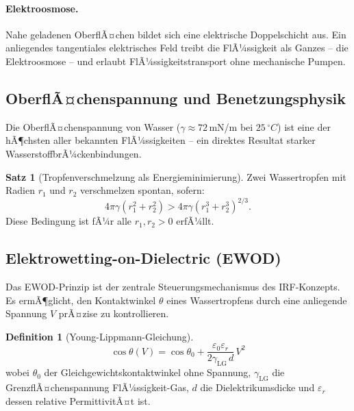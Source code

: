 ﻿\documentclass[a4paper,12pt]{scrreprt}
\theoremstyle{definition}
\newtheorem{definition}{Definition}[section]
\newtheorem{satz}{Satz}[section]
\begin{document}
\paragraph{Elektroosmose.}
Nahe geladenen OberflÃ¤chen bildet sich eine elektrische Doppelschicht aus.
Ein anliegendes tangentiales elektrisches Feld treibt die FlÃ¼ssigkeit als
Ganzes -- die Elektroosmose -- und erlaubt FlÃ¼ssigkeitstransport ohne
mechanische Pumpen.

\subsection{OberflÃ¤chenspannung und Benetzungsphysik}

Die OberflÃ¤chenspannung von Wasser ($\gamma \approx 72$\,mN/m bei $25\,^{\circ}C$)
ist eine der hÃ¶chsten aller bekannten FlÃ¼ssigkeiten -- ein direktes Resultat
starker WasserstoffbrÃ¼ckenbindungen.

\begin{satz}[Tropfenverschmelzung als Energieminimierung]
  Zwei Wassertropfen mit Radien $r_1$ und $r_2$ verschmelzen spontan, sofern:
  \begin{equation}
    4\pi\gamma(r_1^2 + r_2^2) > 4\pi\gamma(r_1^3 + r_2^3)^{2/3}.
    \label{eq:energieminimierung}
  \end{equation}
  Diese Bedingung ist fÃ¼r alle $r_1, r_2 > 0$ erfÃ¼llt.
\end{satz}

\subsection{Elektrowetting-on-Dielectric (EWOD)}

Das EWOD-Prinzip ist der zentrale Steuerungsmechanismus des IRF-Konzepts.
Es ermÃ¶glicht, den Kontaktwinkel $\theta$ eines Wassertropfens durch eine
anliegende Spannung $V$ prÃ¤zise zu kontrollieren.

\begin{definition}[Young-Lippmann-Gleichung]
  \begin{equation}
    \cos\theta(V) = \cos\theta_0 + \frac{\varepsilon_0 \varepsilon_r}{2\gamma_{\mathrm{LG}}\, d}\, V^2
    \label{eq:young_lippmann}
  \end{equation}
  wobei $\theta_0$ der Gleichgewichtskontaktwinkel ohne Spannung,
  $\gamma_{\mathrm{LG}}$ die GrenzflÃ¤chenspannung FlÃ¼ssigkeit-Gas, $d$ die
  Dielektrikumsdicke und $\varepsilon_r$ dessen relative PermittivitÃ¤t ist.
\end{definition}
\end{document}
